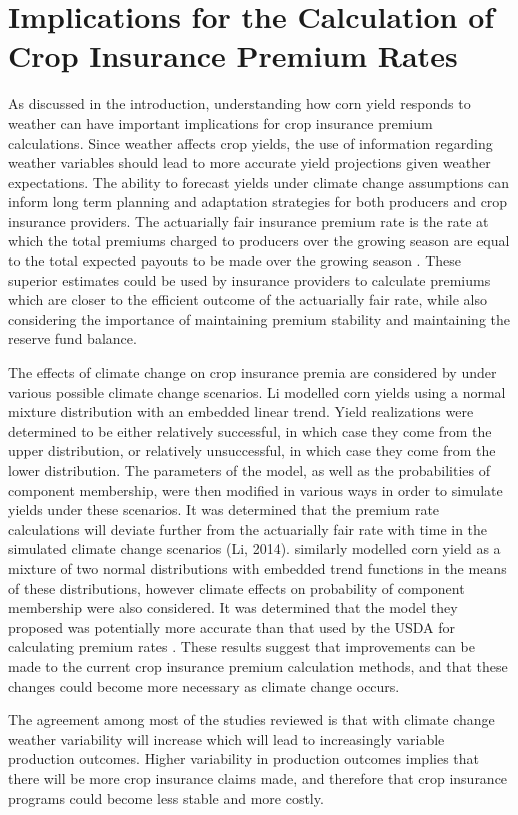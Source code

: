 \section{Implications for the Calculation of Crop Insurance Premium Rates}

As discussed in the introduction, understanding how corn yield responds to weather can have important implications for crop insurance premium calculations. Since weather affects crop yields, the use of information regarding weather variables should lead to more accurate yield projections given weather expectations. The ability to forecast yields under climate change assumptions can inform long term planning and adaptation strategies for both producers and crop insurance providers. The actuarially fair insurance premium rate is the rate at which the total premiums charged to producers over the growing season are equal to the total expected payouts to be made over the growing season \citep{li2014climate}. These superior estimates could be used by insurance providers to calculate premiums which are closer to the efficient outcome of the actuarially fair rate, while also considering the importance of maintaining premium stability and maintaining the reserve fund balance.  

The effects of climate change on crop insurance premia are considered by \cite{li2014climate} under various possible climate change scenarios. Li modelled corn yields using a normal mixture distribution with an embedded linear trend. Yield realizations were determined to be either relatively successful, in which case they come from the upper distribution, or relatively unsuccessful, in which case they come from the lower distribution. The parameters of the model, as well as the probabilities of component membership, were then modified in various ways in order to simulate yields under these scenarios. It was determined that the premium rate calculations will deviate further from the actuarially fair rate with time in the simulated climate change scenarios (Li, 2014). \cite{tolhurst2014technological} similarly modelled corn yield as a mixture of two normal distributions with embedded trend functions in the means of these distributions, however climate effects on probability of component membership were also considered. It was determined that the model they proposed was potentially more accurate than that used by the USDA for calculating premium rates \citep{tolhurst2014technological}. These results suggest that improvements can be made to the current crop insurance premium calculation methods, and that these changes could become more necessary as climate change occurs.

The agreement among most of the studies reviewed is that with climate change weather variability will increase which will lead to increasingly variable production outcomes. Higher variability in production outcomes implies that there will be more crop insurance claims made, and therefore that crop insurance programs could become less stable and more costly. 
